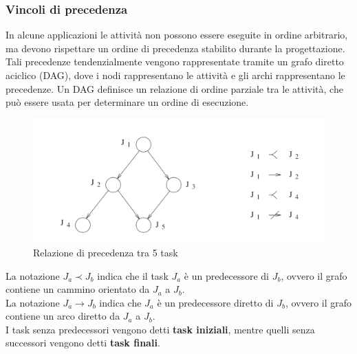 \documentclass[12pt]{article}
\begin{document}
\subsubsection{Vincoli di precedenza}
In alcune applicazioni le attività non possono essere eseguite in ordine arbitrario, ma devono rispettare un ordine di precedenza stabilito durante la progettazione.
Tali precedenze tendenzialmente vengono rappresentate tramite un grafo diretto aciclico (DAG), dove i nodi rappresentano le attività e gli archi rappresentano le precedenze.
Un DAG definisce un relazione di ordine parziale tra le attività, che può essere usata per determinare un ordine di esecuzione.
\begin{figure}[H]
    \includegraphics[width=\textwidth]{pictures/precedenzaTask.png}
    \caption{Relazione di precedenza tra 5 task}
\end{figure}
\noindent La notazione $J_a \prec J_b$ indica che il task $J_a$ è un predecessore di $J_b$, ovvero il grafo contiene un cammino orientato da $J_a$ a $J_b$.
\\
La notazione $J_a \rightarrow J_b$ indica che $J_a$ è un predecessore diretto di $J_b$, ovvero il grafo contiene un arco diretto da $J_a$ a $J_b$.
\\
I task senza predecessori vengono detti \textbf{task iniziali}, mentre quelli senza successori vengono detti \textbf{task finali}.
\end{document}
